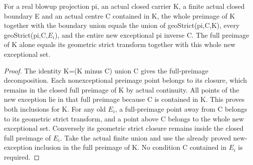 \begin{lemma}
\label{hir:general-nc-original-whole-preimage-step}
\leanok
For a real blowup projection pi, an actual closed carrier K, a finite actual
closed boundary E and an actual centre C contained in K, the whole preimage of
K together with the boundary union equals the union of geoStrict(pi,C,K),
every geoStrict(pi,C,$E_i$), and the entire new exceptional pi inverse C.
The full preimage of K alone equals its geometric strict transform together
with this whole new exceptional set.
\end{lemma}
\begin{proof}
The identity K=(K minus C) union C gives the full-preimage decomposition.
Each nonexceptional preimage point belongs to its closure, which remains in
the closed full preimage of K by actual continuity. All points of the new
exception lie in that full preimage because C is contained in K. This proves
both inclusions for K. For any old $E_i$, a full-preimage point away from C
belongs to its geometric strict transform, and a point above C belongs to the
whole new exceptional set. Conversely its geometric strict closure remains
inside the closed full preimage of $E_i$. Take the actual finite union and use
the already proved new-exception inclusion in the full preimage of K. No
condition C contained in $E_i$ is required.
\end{proof}


